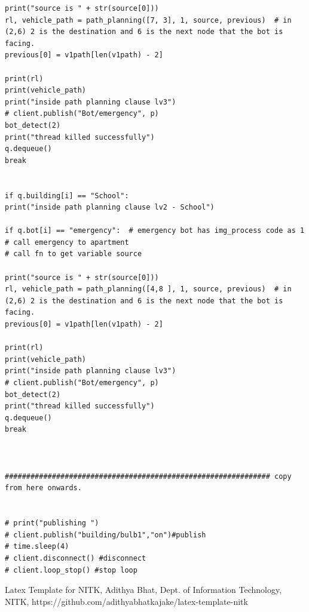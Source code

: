 \documentclass{article}[12pt,a4paper]
\begin{document}
\begin{lstlisting}
print("source is " + str(source[0]))
rl, vehicle_path = path_planning([7, 3], 1, source, previous)  # in (2,6) 2 is the destination and 6 is the next node that the bot is facing.
previous[0] = v1path[len(v1path) - 2]

print(rl)
print(vehicle_path)
print("inside path planning clause lv3")
# client.publish("Bot/emergency", p)
bot_detect(2)
print("thread killed successfully")
q.dequeue()
break


if q.building[i] == "School":
print("inside path planning clause lv2 - School")

if q.bot[i] == "emergency":  # emergency bot has img_process code as 1
# call emergency to apartment
# call fn to get variable source

print("source is " + str(source[0]))
rl, vehicle_path = path_planning([4,8 ], 1, source, previous)  # in (2,6) 2 is the destination and 6 is the next node that the bot is facing.
previous[0] = v1path[len(v1path) - 2]

print(rl)
print(vehicle_path)
print("inside path planning clause lv3")
# client.publish("Bot/emergency", p)
bot_detect(2)
print("thread killed successfully")
q.dequeue()
break



############################################################## copy from here onwards.


# print("publishing ")
# client.publish("building/bulb1","on")#publish
# time.sleep(4)
# client.disconnect() #disconnect
# client.loop_stop() #stop loop
\end{lstlisting}

\newpage
\begin{thebibliography}{1}
    
 Latex Template for NITK, Adithya Bhat, Dept. of Information Technology, NITK, https://github.com/adithyabhatkajake/latex-template-nitk

\end{thebibliography}
\end{document}
